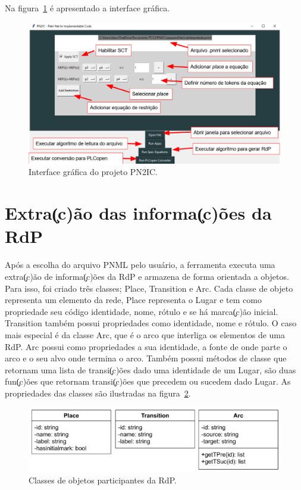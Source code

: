 Na figura~\ref{fig:interfacegrafica} \'e apresentado a interface gr\'afica.

\begin{figure}[!htb]
	\caption[Interface gr\'afica do projeto PN2IC.]{Interface gr\'afica do projeto PN2IC.}
	\label{fig:interfacegrafica}
	\includegraphics[width=16cm]{./figuras/INTERFACE_GRAFICA_PN2IC.png}\centering
\end{figure}

\section{Extra\c(c)\~ao das informa\c(c)\~oes da RdP}
Ap\'os a escolha do arquivo PNML pelo usu\'ario, a ferramenta executa uma extra\c(c)\~ao de informa\c(c)\~oes da RdP e armazena de forma orientada a objetos. Para isso, foi criado tr\^es classes; Place, Transition e Arc. Cada classe de objeto representa um elemento da rede, Place representa o Lugar e tem como propriedade seu c\'odigo identidade, nome, r\'otulo e se h\'a marca\c(c)\~ao inicial. Transition tamb\'em possui propriedades como identidade, nome e r\'otulo.
O caso mais especial \'e da classe Arc, que \'e o arco que interliga os elementos de uma RdP. Arc possui como propriedades a sua identidade, a fonte de onde parte o arco e o seu alvo onde termina o arco. Tamb\'em possui m\'etodos de classe que retornam uma lista de transi\c(c)\~oes dado uma identidade de um Lugar, s\~ao duas fun\c(c)\~oes que retornam transi\c(c)\~oes que precedem ou sucedem dado Lugar. As propriedades das classes s\~ao ilustradas na figura~\ref{fig:classes}.

\begin{figure}[!htb]
	\caption[Classes de objetos participantes da RdP.]{Classes de objetos participantes da RdP.}
	\label{fig:classes}
	\includegraphics[width=16cm]{./figuras/CLASSES.png}\centering
\end{figure}

